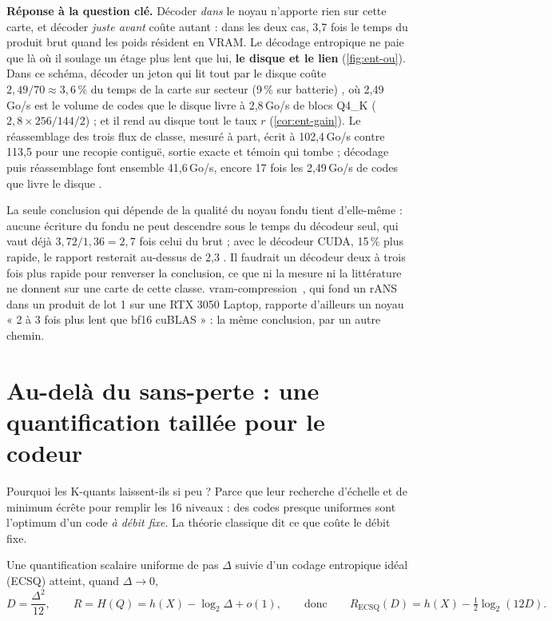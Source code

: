\textbf{Réponse à la question clé.} Décoder \emph{dans} le noyau n'apporte rien sur cette carte, et décoder \emph{juste avant} coûte autant : dans les deux cas, 3,7 fois le temps du produit brut quand les poids résident en VRAM. Le décodage entropique ne paie que là où il soulage un étage plus lent que lui, \textbf{le disque et le lien} (\cref{fig:ent-ou}). Dans ce schéma, décoder un jeton qui lit tout par le disque coûte $2{,}49/70 \approx 3{,}6\,\%$ du temps de la carte sur secteur (9\,\% sur batterie) \calc, où 2,49\,Go/s est le volume de codes que le disque livre à 2,8\,Go/s de blocs Q4\_K ($2{,}8 \times 256/144/2$) ; et il rend au disque tout le taux $r$ (\cref{cor:ent-gain}). Le réassemblage des trois flux de classe, mesuré à part, écrit à 102,4\,Go/s contre 113,5 pour une recopie contiguë, sortie exacte et témoin qui tombe \mes ; décodage puis réassemblage font ensemble 41,6\,Go/s, encore 17 fois les 2,49\,Go/s de codes que livre le disque \calc.

La seule conclusion qui dépende de la qualité du noyau fondu tient d'elle-même : aucune écriture du fondu ne peut descendre sous le temps du décodeur seul, qui vaut déjà $3{,}72/1{,}36 = 2{,}7$ fois celui du brut ; avec le décodeur CUDA, 15\,\% plus rapide, le rapport resterait au-dessus de 2,3 \calc. Il faudrait un décodeur deux à trois fois plus rapide pour renverser la conclusion, ce que ni la mesure ni la littérature ne donnent sur une carte de cette classe. vram-compression~\cite{nuri2026vramcompression}, qui fond un rANS dans un produit de lot 1 sur une RTX 3050 Laptop, rapporte d'ailleurs un noyau « 2 à 3 fois plus lent que bf16 cuBLAS » \litt : la même conclusion, par un autre chemin.

\section{Au-delà du sans-perte : une quantification taillée pour le codeur}\label{sec:ent-ecsq}

Pourquoi les K-quants laissent-ils si peu ? Parce que leur recherche d'échelle et de minimum écrête pour remplir les 16 niveaux : des codes presque uniformes sont l'optimum d'un code \emph{à débit fixe}. La théorie classique dit ce que coûte le débit fixe.

\begin{theoreme}\label{thm:gish-pierce}
Une quantification scalaire uniforme de pas $\Delta$ suivie d'un codage entropique idéal (ECSQ) atteint, quand $\Delta \to 0$,
\begin{equation}\label{eq:gish-pierce}
D = \frac{\Delta^2}{12}, \qquad R = H(Q) = h(X) - \log_2 \Delta + o(1), \qquad\text{donc}\qquad R_{\mathrm{ECSQ}}(D) = h(X) - \tfrac12 \log_2 (12 D).
\end{equation}
\end{theoreme}

